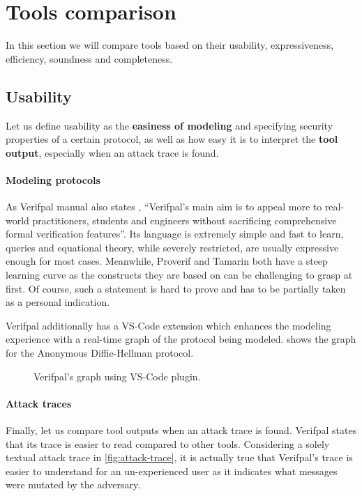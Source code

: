 
\section{Tools comparison}
\label{section:features-comparison}
In this section we will compare tools based on their usability, expressiveness, efficiency, soundness and completeness.

\subsection{Usability}
Let us define usability as the \textbf{easiness of modeling} and specifying security properties of a certain protocol, as well as how easy it is to interpret the \textbf{tool output}, especially when an attack trace is found.

\paragraph{Modeling protocols}
As Verifpal manual also states \cite{VerifpalManual}, ``Verifpal's main aim is to appeal more to real-world practitioners, students and engineers without sacrificing comprehensive formal verification features''. Its language is extremely simple and fast to learn, queries and equational theory, while severely restricted, are usually expressive enough for most cases.
Meanwhile, Proverif and Tamarin both have a steep learning curve as the constructs they are based on can be challenging to grasp at first. Of course, such a statement is hard to prove and has to be partially taken as a personal indication.

Verifpal additionally has a VS-Code extension which enhances the modeling experience with a real-time graph of the protocol being modeled.  shows the graph for the Anonymous Diffie-Hellman protocol.

\begin{figure}[t]
    \centering
    \caption{Verifpal's graph using VS-Code plugin.}
    \label{fig:verifpal-protocol-graph}
\end{figure}


\paragraph{Attack traces}
Finally, let us compare tool outputs when an attack trace is found. Verifpal states that its trace is easier to read compared to other tools. Considering a solely textual attack trace in \cref{fig:attack-trace}, it is actually true that Verifpal's trace is easier to understand for an un-experienced user as it indicates what messages were mutated by the adversary.

